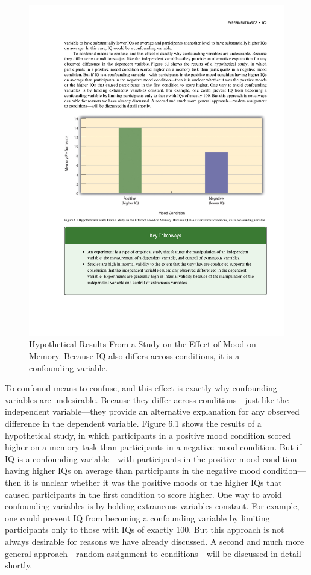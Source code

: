\begin{figure}[0in]
\includegraphics[width=\linewidth]{figures/C6confound.pdf}
\caption{Hypothetical Results From a Study on the Effect of Mood on Memory. Because IQ also differs across conditions, it is a confounding variable.}
\label{fig:confound}
\end{figure}

To confound means to confuse, and this effect is exactly why confounding variables are undesirable. Because they differ across conditions---just like the independent variable---they provide an alternative explanation for any observed difference in the dependent variable. Figure 6.1 shows the results of a hypothetical study, in which participants in a positive mood condition scored higher on a memory task than participants in a negative mood condition. But if IQ is a confounding variable---with participants in the positive mood condition having higher IQs on average than participants in the negative mood condition---then it is unclear whether it was the positive moods or the higher IQs that caused participants in the first condition to score higher. One way to avoid confounding variables is by holding extraneous variables constant. For example, one could prevent IQ from becoming a confounding variable by limiting participants only to those with IQs of exactly 100. But this approach is not always desirable for reasons we have already discussed. A second and much more general approach---random assignment to conditions---will be discussed in detail shortly.

